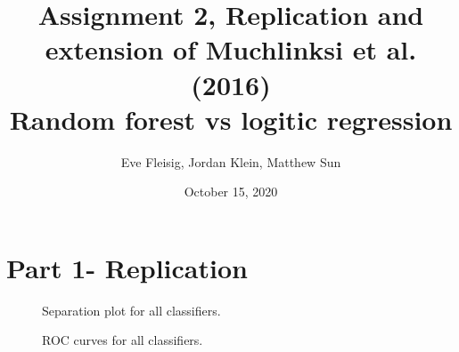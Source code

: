 \documentclass{article}
\title{Assignment 2, Replication and extension of Muchlinksi et al. (2016)\\Random forest vs logitic regression}
\date{October 15, 2020}
\author{Eve Fleisig, Jordan Klein, Matthew Sun}
\begin{document}
\maketitle

\section*{Part 1- Replication}

\newpage
\begin{figure}[H]
    \caption{Separation plot for all classifiers.}
\end{figure}

\begin{figure}[H]
    \caption{ROC curves for all classifiers.}
\end{figure}
\end{document}
